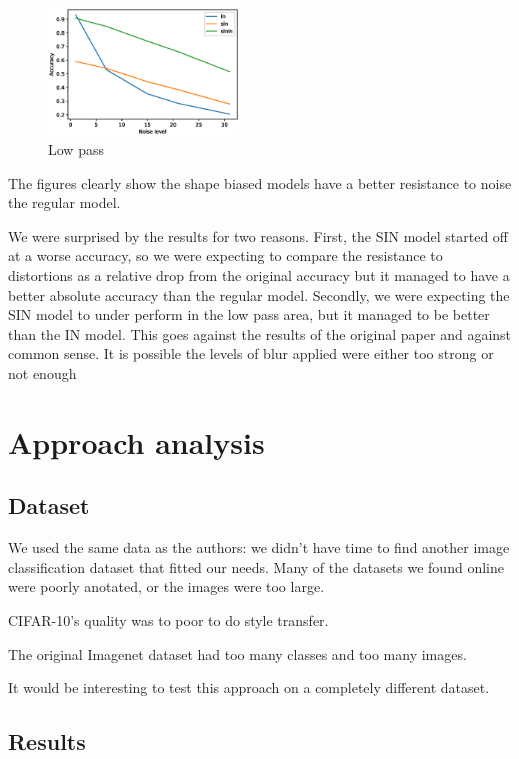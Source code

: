 \documentclass{article}
\begin{document}
\begin{figure}[h!]
\centering
\includegraphics[width = 0.45\textwidth]{imgs/low_pass}
\caption{Low pass}
\end{figure}

The figures clearly show the shape biased models have a better resistance to noise the regular model.

We were surprised by the results for two reasons.
First, the SIN model started off at a worse accuracy, so we were expecting to compare the resistance to distortions as a relative drop from the original accuracy but it managed to have a better absolute accuracy than the regular model.
Secondly, we were expecting the SIN model to under perform in the low pass area, but it managed to be better than the IN model. This goes against the results of the original paper and against common sense. It is possible the levels of blur applied were either too strong or not enough

\section{Approach analysis}

\subsection{Dataset}

We used the same data as the authors: we didn't have time
to find another image classification dataset that fitted our needs.
Many of the datasets we found online were poorly anotated, or the images
were too large.

CIFAR-10's quality was to poor to do style transfer.

The original Imagenet dataset had too many classes and too many images.

It would be interesting to test this approach on a completely different dataset.

\subsection{Results}
\end{document}

